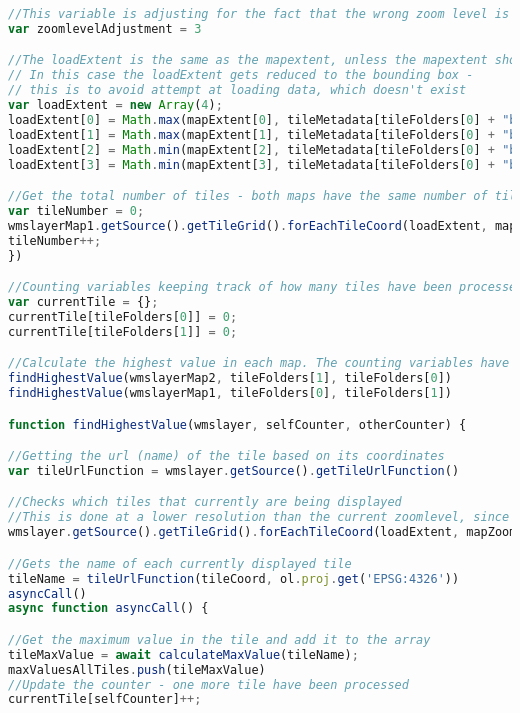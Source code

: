 \begin{lstlisting}[language=JavaScript, caption={The JavaScript for the map}, label= VoresJS,escapechar=|]
//This variable is adjusting for the fact that the wrong zoom level is being loaded
var zoomlevelAdjustment = 3

//The loadExtent is the same as the mapextent, unless the mapextent shows an area outside the data area
// In this case the loadExtent gets reduced to the bounding box -
// this is to avoid attempt at loading data, which doesn't exist
var loadExtent = new Array(4);
loadExtent[0] = Math.max(mapExtent[0], tileMetadata[tileFolders[0] + "boundingBox"][0]);
loadExtent[1] = Math.max(mapExtent[1], tileMetadata[tileFolders[0] + "boundingBox"][1])
loadExtent[2] = Math.min(mapExtent[2], tileMetadata[tileFolders[0] + "boundingBox"][2])
loadExtent[3] = Math.min(mapExtent[3], tileMetadata[tileFolders[0] + "boundingBox"][3])

//Get the total number of tiles - both maps have the same number of tiles, so no need to run this twice
var tileNumber = 0;
wmslayerMap1.getSource().getTileGrid().forEachTileCoord(loadExtent, mapZoom - zoomlevelAdjustment, function(tileCoord) {
tileNumber++;
})

//Counting variables keeping track of how many tiles have been processed in each map
var currentTile = {};
currentTile[tileFolders[0]] = 0;
currentTile[tileFolders[1]] = 0;

//Calculate the highest value in each map. The counting variables have been included to know when to draw the layer
findHighestValue(wmslayerMap2, tileFolders[1], tileFolders[0])
findHighestValue(wmslayerMap1, tileFolders[0], tileFolders[1])

function findHighestValue(wmslayer, selfCounter, otherCounter) {

//Getting the url (name) of the tile based on its coordinates
var tileUrlFunction = wmslayer.getSource().getTileUrlFunction()

//Checks which tiles that currently are being displayed
//This is done at a lower resolution than the current zoomlevel, since loading otherwise would be too slow
wmslayer.getSource().getTileGrid().forEachTileCoord(loadExtent, mapZoom - zoomlevelAdjustment, function(tileCoord) {

//Gets the name of each currently displayed tile
tileName = tileUrlFunction(tileCoord, ol.proj.get('EPSG:4326'))
asyncCall()
async function asyncCall() {

//Get the maximum value in the tile and add it to the array
tileMaxValue = await calculateMaxValue(tileName);
maxValuesAllTiles.push(tileMaxValue)
//Update the counter - one more tile have been processed
currentTile[selfCounter]++;


\end{lstlisting}
